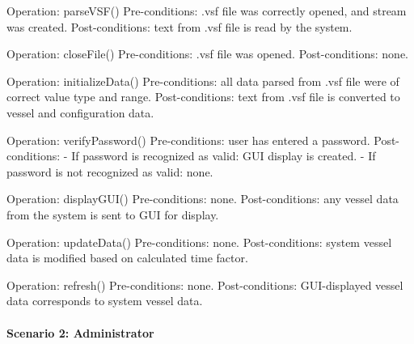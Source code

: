 \documentclass{article}
\begin{document}
Operation: parseVSF()
Pre-conditions: .vsf file was correctly opened, and stream was created.
Post-conditions: text from .vsf file is read by the system.

Operation: closeFile()
Pre-conditions: .vsf file was opened.
Post-conditions: none.

Operation: initializeData()
Pre-conditions: all data parsed from .vsf file were of correct value type and range.
Post-conditions: text from .vsf file is converted to vessel and configuration data.

Operation: verifyPassword()
Pre-conditions: user has entered a password.
Post-conditions:
- If password is recognized as valid: GUI display is created.
- If password is not recognized as valid: none.

Operation: displayGUI()
Pre-conditions: none.
Post-conditions: any vessel data from the system is sent to GUI for display.

Operation: updateData()
Pre-conditions: none.
Post-conditions: system vessel data is modified based on calculated time factor.

Operation: refresh()
Pre-conditions: none.
Post-conditions: GUI-displayed vessel data corresponds to system vessel data.

\paragraph{Scenario 2: Administrator}
\end{document}
